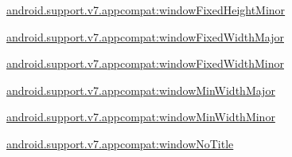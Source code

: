{\ttfamily \hyperlink{classandroid_1_1support_1_1v7_1_1appcompat_1_1R_1_1styleable_a5ea54cdfaf428b78c942f5de400a165f}{android.\+support.\+v7.\+appcompat\+:window\+Fixed\+Height\+Minor}}

{\ttfamily \hyperlink{classandroid_1_1support_1_1v7_1_1appcompat_1_1R_1_1styleable_aa1e116caa12a145c67596dd4910cfd53}{android.\+support.\+v7.\+appcompat\+:window\+Fixed\+Width\+Major}}

{\ttfamily \hyperlink{classandroid_1_1support_1_1v7_1_1appcompat_1_1R_1_1styleable_a373701a9ce98e38b9d2527222d764011}{android.\+support.\+v7.\+appcompat\+:window\+Fixed\+Width\+Minor}}

{\ttfamily \hyperlink{classandroid_1_1support_1_1v7_1_1appcompat_1_1R_1_1styleable_afd626a38693cbcfdd8ac1d5ff7c02a96}{android.\+support.\+v7.\+appcompat\+:window\+Min\+Width\+Major}}

{\ttfamily \hyperlink{classandroid_1_1support_1_1v7_1_1appcompat_1_1R_1_1styleable_a907f4aa44d62f6a4a0f50520dea3f4f1}{android.\+support.\+v7.\+appcompat\+:window\+Min\+Width\+Minor}}

{\ttfamily \hyperlink{classandroid_1_1support_1_1v7_1_1appcompat_1_1R_1_1styleable_a3d6aa74951e0bed5e26ea58ec3e818f6}{android.\+support.\+v7.\+appcompat\+:window\+No\+Title}}

